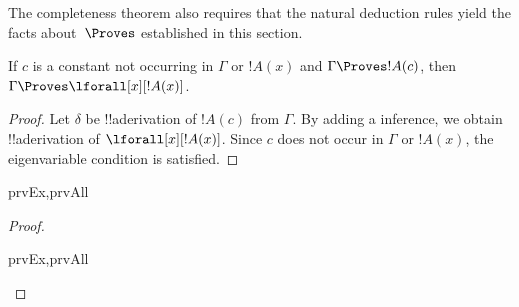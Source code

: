 \documentclass[../../../include/open-logic-section]{subfiles}
\begin{document}


\begin{explain}
  The completeness theorem also requires that the natural deduction
  rules yield the facts about~$\Proves$ established in this section.
\end{explain}

\begin{thm}
 If $c$ is a constant not occurring
in $\Gamma$ or $!A(x)$ and $\Gamma \Proves !A(c)$, then $\Gamma
\Proves \lforall[x][!A(x)]$.
\end{thm}

\begin{proof}
Let $\delta$ be !!a{derivation} of $!A(c)$ from $\Gamma$.  By adding a
\Intro{\lforall} inference, we obtain !!a{derivation} of
$\lforall[x][!A(x)]$. Since $c$ does not occur in $\Gamma$ or $!A(x)$,
the eigenvariable condition is satisfied.
\end{proof}

\begin{prop}
\begin{tagenumerate}{prvEx,prvAll}

\end{tagenumerate}
\end{prop}

\begin{proof}
\begin{tagenumerate}{prvEx,prvAll}

\end{tagenumerate}
\end{proof}
\end{document}
